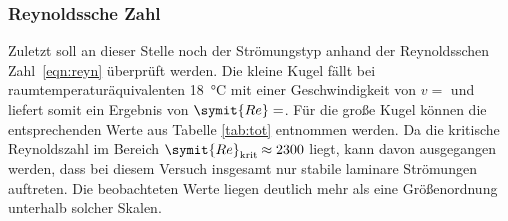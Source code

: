 \subsubsection{Reynoldssche Zahl}

Zuletzt soll an dieser Stelle noch der Strömungstyp anhand der Reynoldsschen Zahl~\eqref{eqn:reyn} überprüft werden.
Die kleine Kugel fällt bei raumtemperaturäquivalenten \qty{18}{\celsius} mit einer Geschwindigkeit von
$v = $ und liefert somit ein Ergebnis von $\symit{Re} = $. Für die
große Kugel können die entsprechenden Werte aus Tabelle \ref{tab:tot} entnommen werden. Da die kritische Reynoldszahl
im Bereich $\symit{Re}_\text{krit} \hspace{-0.15ex} \approx 2300$ liegt, kann davon ausgegangen werden, dass bei
diesem Versuch insgesamt nur stabile laminare Strömungen auftreten. Die beobachteten Werte liegen deutlich mehr als
eine Größenordnung unterhalb solcher Skalen.

\newpage
